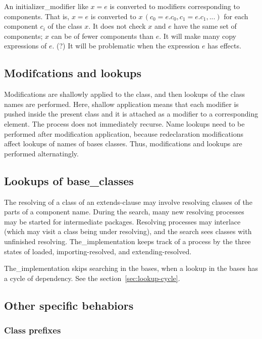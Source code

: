 \documentclass[10pt,b5paper]{article}
\begin{document}
An initializer_modifier like $x=e$ is converted to modifiers
corresponding to components.  That is, $x=e$ is converted to
$x\,(c_0=e.c_0,c_1=e.c_1,...)$ for each component $c_i$ of the class
$x$.  It does not check $x$ and $e$ have the same set of components;
$x$ can be of fewer components than $e$.  It will make many copy
expressions of $e$.  (?) It will be problematic when the expression
$e$ has effects.


\subsection{Modifcations and lookups}

Modifications are shallowly applied to the class, and then lookups of
the class names are performed.  Here, shallow application means that
each modifier is pushed inside the present class and it is attached as
a modifier to a corresponding element.  The process does not
immediately recurse.  Name lookups need to be performed after
modification application, because redeclaration modifications affect
lookups of names of bases classes.  Thus, modifications and lookups
are performed alternatingly.


\subsection{Lookups of base_classes}

The resolving of a class of an extends-clause may involve resolving
classes of the parts of a component name.  During the search, many new
resolving processes may be started for intermediate packages.
Resolving processes may interlace (which may visit a class being under
resolving), and the search sees classes with unfinished resolving.
The_implementation keeps track of a process by the three states of
loaded, importing-resolved, and extending-resolved.

The_implementation skips searching in the bases, when a lookup in the
bases has a cycle of dependency.  See the
section~\ref{sec:lookup-cycle}.


\subsection{Other specific behabiors}

\subsubsection*{Class prefixes}
\end{document}

